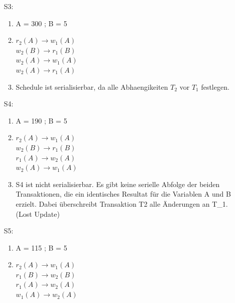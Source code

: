 \documentclass{article}
\begin{document}
\begin{enumerate}
\begin{enumerate}
\begin{enumerate}
                \end{enumerate}
            \item[S3:]
                \begin{enumerate}
                    \item A = 300 ; B = 5
                    \item   $r_2(A) \longrightarrow w_1(A)$ \\
                            $w_2(B) \longrightarrow r_1(B)$ \\
                            $w_2(A) \longrightarrow w_1(A)$ \\
                            $w_2(A) \longrightarrow r_1(A)$ \\
                    \item Schedule ist serialisierbar, da alle Abhaengikeiten $T_2$ vor $T_1$ festlegen.
                \end{enumerate}
            \item[S4:]
                \begin{enumerate}
                    \item A = 190 ; B = 5
                    \item   $r_2(A) \longrightarrow w_1(A)$ \\
                            $w_2(B) \longrightarrow r_1(B)$ \\
                            $r_1(A) \longrightarrow w_2(A)$ \\
                            $w_2(A) \longrightarrow w_1(A)$ \\
                    \item S4 ist nicht serialisierbar. Es gibt keine serielle Abfolge der beiden Transaktionen, die ein identisches
                            Resultat für die Variablen A und B erzielt. Dabei überschreibt Transaktion T2 alle Änderungen an T_1. (Lost Update)
                \end{enumerate}
            \item[S5:]
                \begin{enumerate}
                    \item A = 115 ; B = 5
                    \item   $r_2(A) \longrightarrow w_1(A)$ \\
                            $r_1(B) \longrightarrow w_2(B)$ \\
                            $r_1(A) \longrightarrow w_2(A)$ \\
                            $w_1(A) \longrightarrow w_2(A)$ \\

\end{enumerate}
\end{enumerate}
\end{enumerate}
\end{document}

